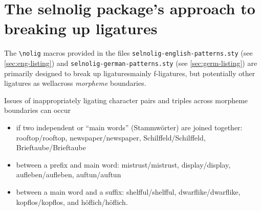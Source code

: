 \documentclass[12pt]{article}
\newcommand{\pkg}[1]{\textsf{#1}}
\newcommand{\opt}[1]{\texttt{#1}}
\newcommand{\cmmd}[1]{\texttt{\textbackslash #1}}
\begin{document}
\section[The selnolig package's approach to breaking up ligatures]{The \pkg{selnolig} package's approach to breaking up ligatures}

The \cmmd{nolig} macros provided in the files \opt{selnolig-english-patterns.sty} (see \cref{sec:eng-listing}) and \opt{selnolig-german-patterns.sty} (see \cref{sec:germ-listing}) are primarily designed to break up ligatures\textemdash mainly f-ligatures, but potentially other ligatures as well\textemdash across \emph{morpheme} boundaries. 

Issues of inappropriately ligating character pairs and triples across morpheme boundaries can occur 
\begin{itemize}
\item if two independent or \enquote{main words} (Stammwörter) are joined together: \mbox{rooftop}\slash rooftop, \mbox{newspaper}\slash newspaper, \mbox{Schilffeld}\slash Schilffeld, \mbox{Brieftaube}\slash Brieftaube \phantom{x}   
\item between a prefix and main word: mi\mbox{st}rust\slash mistrust, di\mbox{sp}lay\slash display, \mbox{aufleben}\slash aufleben, \mbox{auftun}\slash auftun \phantom{x}
\item between a main word and a suffix: \mbox{shelfful}\slash shelfful, \mbox{dwarflike}\slash  dwarflike, \mbox{kopflos}\slash kopflos, and \mbox{höflich}\slash höflich. \phantom{x}
\end{itemize}
\end{document}

